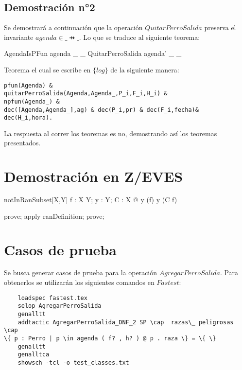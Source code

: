 \documentclass[12pt,zed]{article}
\begin{document}
\subsection*{Demostración n°2}


Se demostrará a continuación que la operación $QuitarPerroSalida$ preserva el invariante $agenda \in \_ \pfun \_$. Lo que se traduce al siguiente teorema: \\

\begin{theorem}{AgendaIsPFun}
agenda \in \_ \pfun \_ \land QuitarPerroSalida \implies agenda' \in \_ \pfun \_
\end{theorem}

Teorema el cual se escribe en $\{log\}$ de la siguiente manera:

\begin{verbatim}
pfun(Agenda) &
quitarPerroSalida(Agenda,Agenda_,P_i,F_i,H_i) &
npfun(Agenda_) &
dec([Agenda,Agenda_],ag) & dec(P_i,pr) & dec(F_i,fecha)&
dec(H_i,hora).
\end{verbatim}

La respuesta al correr los teoremas es no, demostrando así los teoremas presentados.

\section*{Demostración en Z/EVES}

\begin{theorem}{notInRanSubset}[X,Y]
\forall f : X \rel Y; y : Y; C : \power X @ y \notin (\ran f) \implies y \notin \ran (C \ndres f)
\end{theorem}

\begin{zproof}[notInRanSubset]
prove;
apply ranDefinition;
prove;
\end{zproof}

\section*{Casos de prueba}

Se busca generar casos de prueba para la operación $AgregarPerroSalida$. Para obtenerlos se utilizarán los siguientes comandos en $Fastest$:

\begin{verbatim}
    loadspec fastest.tex
    selop AgregarPerroSalida
    genalltt
    addtactic AgregarPerroSalida_DNF_2 SP \cap  razas\_ peligrosas \cap
\{ p : Perro | p \in agenda ( f? , h? ) @ p . raza \} = \{ \}
    genalltt
    genalltca
    showsch -tcl -o test_classes.txt
\end{verbatim}
\end{document}
